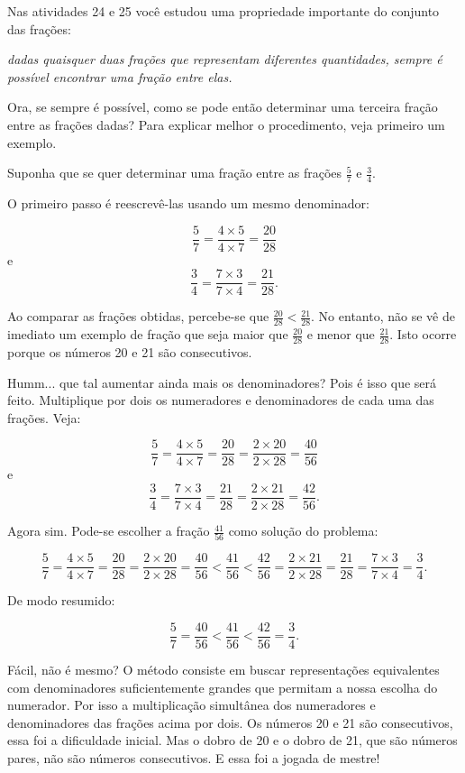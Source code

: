 \begin{refletindo*}[breakable]{}{}  
  
  Nas atividades 24 e 25 você estudou uma propriedade importante do conjunto das frações:  
  
{\it  dadas quaisquer duas frações que representam diferentes quantidades, sempre é possível encontrar uma  fração entre elas.}   
  

  Ora, se sempre é possível, como se pode então determinar uma terceira fração entre as frações dadas? Para explicar melhor o procedimento, veja primeiro um exemplo.  
  
  Suponha que se quer determinar uma fração entre as frações   $\frac{5}{7}$ e   $\frac{3}{4}$.  
  
  O primeiro passo é reescrevê-las usando um mesmo denominador:  
  
  $$\dfrac{5}{7} = \dfrac{4 \times 5}{ 4 \times 7} = \dfrac{20}{28}$$
  e  
  $$\dfrac{3}{4} = \dfrac{7 \times 3}{ 7 \times 4} = \dfrac{21}{28}.$$
  
  Ao comparar as frações obtidas, percebe-se que   $\frac{20}{28}<\frac{21}{28}$. No entanto, não se vê de imediato um exemplo de fração que seja maior que   $\frac{20}{28}$ e menor que   $\frac{21}{28}$. Isto ocorre porque os números 20 e 21 são consecutivos.  
  
  Humm... que tal aumentar ainda mais os denominadores? Pois é isso que será feito.  Multiplique por dois os numeradores e denominadores de cada uma das frações. Veja:  
  
  $$\dfrac{5}{7} = \dfrac{4 \times 5}{ 4 \times 7} = \dfrac{20}{28} = \dfrac{2 \times 20}{ 2 \times 28} = \dfrac{40}{56}$$
  e  
  $$\dfrac{3}{4} = \dfrac{7 \times 3}{ 7 \times 4} = \dfrac{21}{28} = \dfrac{2 \times 21}{2 \times 28} = \dfrac{42}{56}.$$
  
  Agora sim. Pode-se escolher a fração   $\frac{41}{56}$ como solução do problema:  
  
  $$\dfrac{5}{7} = \dfrac{4 \times 5}{ 4 \times 7} = \dfrac{20}{28} = \dfrac{2 \times 20}{ 2 \times 28} = \dfrac{40}{56} < \dfrac{41}{56} < \dfrac{42}{56} = \dfrac{2 \times 21}{2 \times 28} =  \dfrac{21}{28} = \dfrac{7 \times 3}{ 7 \times 4} = \dfrac{3}{4}.$$
  
  De modo resumido:  
  
  $$\dfrac{5}{7} = \dfrac{40}{56} < \dfrac{41}{56} < \dfrac{42}{56} =\dfrac{3}{4}.$$
  
  Fácil, não é mesmo? O método consiste em buscar representações equivalentes com denominadores suficientemente grandes que permitam a nossa escolha do numerador. Por isso a multiplicação simultânea dos numeradores e denominadores das frações acima por dois. Os números 20 e 21 são consecutivos, essa foi a dificuldade inicial. Mas o dobro de 20 e o dobro de 21, que são números pares, não são números consecutivos. E essa foi a jogada de mestre!  
  

\end{refletindo*}
